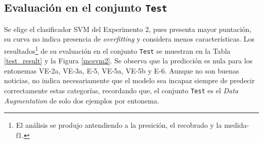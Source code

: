 \subsection{Evaluaci\'on en el conjunto \texttt{Test}}
Se elige el clasificador SVM del Experimento 2, pues presenta mayor puntaci\'on, su curva no indica presencia de \emph{overfitting} y considera menos caracter\'isticas. Los resultados\footnote{El an\'alisis se produjo antendiendo a la presici\'on, el recobrado y la medida-f1\cite{murphy2012machine,bay2009evaluation}.} de su evaluaci\'on en el conjunto \texttt{Test} se muestran en la Tabla \ref{test_result} y la Figura \ref{mcsvm2}. Se observa que la predicci\'on es nula para los entonemas VE-2a, VE-3a, E-5, VE-5a, VE-5b y E-6. Aunque no son buenas noticias, no indica necesariamente que el modelo sea incapaz siempre de predecir correctamente estas categor\'ias, recordando que, el conjunto \texttt{Test} es el \emph{Data Augmentation} de solo dos ejemplos por entonema.
